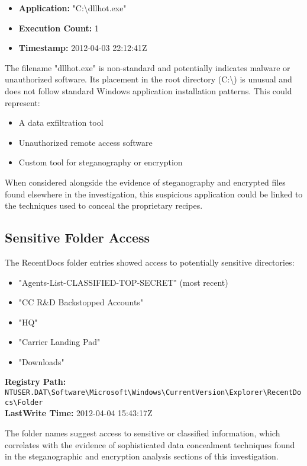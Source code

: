 \begin{itemize}
    \item \textbf{Application:} "C:\textbackslash dllhot.exe"
    \item \textbf{Execution Count:} 1
    \item \textbf{Timestamp:} 2012-04-03 22:12:41Z
\end{itemize}

The filename "dllhot.exe" is non-standard and potentially indicates malware or unauthorized software. Its placement in the root directory (C:\textbackslash) is unusual and does not follow standard Windows application installation patterns. This could represent:

\begin{itemize}
    \item A data exfiltration tool
    \item Unauthorized remote access software
    \item Custom tool for steganography or encryption
\end{itemize}

When considered alongside the evidence of steganography and encrypted files found elsewhere in the investigation, this suspicious application could be linked to the techniques used to conceal the proprietary recipes.

\subsection{Sensitive Folder Access}
The RecentDocs folder entries showed access to potentially sensitive directories:

\begin{itemize}
    \item "Agents-List-CLASSIFIED-TOP-SECRET" (most recent)
    \item "CC R\&D Backstopped Accounts"
    \item "HQ"
    \item "Carrier Landing Pad"
    \item "Downloads"
\end{itemize}

\textbf{Registry Path:} \texttt{NTUSER.DAT\textbackslash Software\textbackslash Microsoft\textbackslash Windows\textbackslash CurrentVersion\textbackslash Explorer\textbackslash RecentDocs\textbackslash Folder}\\
\textbf{LastWrite Time:} 2012-04-04 15:43:17Z

The folder names suggest access to sensitive or classified information, which correlates with the evidence of sophisticated data concealment techniques found in the steganographic and encryption analysis sections of this investigation.

